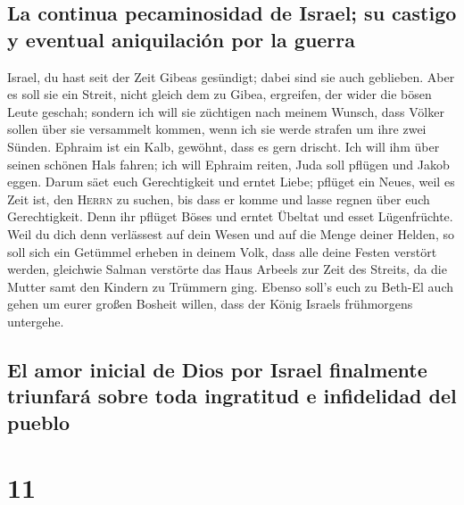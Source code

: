 \hypertarget{la-continua-pecaminosidad-de-israel-su-castigo-y-eventual-aniquilaciuxf3n-por-la-guerra}{%
\subsection{La continua pecaminosidad de Israel; su castigo y eventual
aniquilación por la
guerra}\label{la-continua-pecaminosidad-de-israel-su-castigo-y-eventual-aniquilaciuxf3n-por-la-guerra}}

 Israel, du hast seit der Zeit Gibeas gesündigt; dabei
sind sie auch geblieben. Aber es soll sie ein Streit, nicht gleich dem
zu Gibea, ergreifen, der wider die bösen Leute geschah; 
sondern ich will sie züchtigen nach meinem Wunsch, dass Völker sollen
über sie versammelt kommen, wenn ich sie werde strafen um ihre zwei
Sünden.  Ephraim ist ein Kalb, gewöhnt, dass es gern
drischt. Ich will ihm über seinen schönen Hals fahren; ich will Ephraim
reiten, Juda soll pflügen und Jakob eggen.  Darum säet
euch Gerechtigkeit und erntet Liebe; pflüget ein Neues, weil es Zeit
ist, den \textsc{Herrn} zu suchen, bis dass er komme und lasse regnen
über euch Gerechtigkeit.  Denn ihr pflüget Böses und
erntet Übeltat und esset Lügenfrüchte.  Weil du dich denn
verlässest auf dein Wesen und auf die Menge deiner Helden, so soll sich
ein Getümmel erheben in deinem Volk, dass alle deine Festen verstört
werden, gleichwie Salman verstörte das Haus Arbeels zur Zeit des
Streits, da die Mutter samt den Kindern zu Trümmern ging.
 Ebenso soll's euch zu Beth-El auch gehen um eurer großen
Bosheit willen, dass der König Israels frühmorgens untergehe.

\hypertarget{el-amor-inicial-de-dios-por-israel-finalmente-triunfaruxe1-sobre-toda-ingratitud-e-infidelidad-del-pueblo}{%
\subsection{El amor inicial de Dios por Israel finalmente triunfará
sobre toda ingratitud e infidelidad del
pueblo}\label{el-amor-inicial-de-dios-por-israel-finalmente-triunfaruxe1-sobre-toda-ingratitud-e-infidelidad-del-pueblo}}

\hypertarget{section-10}{%
\section{11}\label{section-10}}

